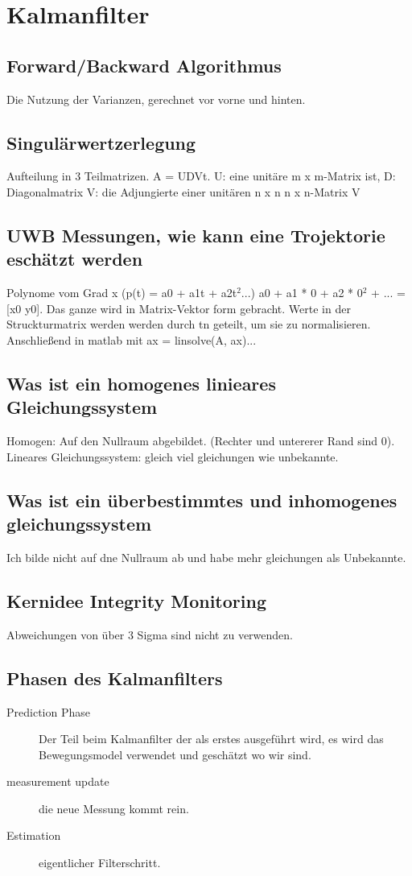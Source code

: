 
\section{Kalmanfilter}
\label{sec:faq:kalmanfilter}


\subsection{Forward/Backward Algorithmus}
Die Nutzung der Varianzen, gerechnet vor vorne und hinten.
\subsection{Singulärwertzerlegung}
 Aufteilung in 3 Teilmatrizen. A = UDVt. U: eine unitäre  m x m-Matrix ist, D: Diagonalmatrix V:  die Adjungierte einer unitären n x n  n x n-Matrix V
\subsection{UWB Messungen, wie kann eine Trojektorie eschätzt werden}
Polynome vom Grad x (p(t) = a0 + a1t + a2t$^2$...) a0 + a1 * 0 + a2 * 0$^2$ + ... = [x0 y0]. Das ganze wird in Matrix-Vektor form gebracht.  Werte in der Struckturmatrix werden werden durch tn geteilt, um sie zu normalisieren. Anschließend in matlab mit ax = linsolve(A, ax)... 
\subsection{Was ist ein homogenes linieares Gleichungssystem}
Homogen: Auf den Nullraum abgebildet. (Rechter und untererer Rand sind 0). Lineares Gleichungssystem: gleich viel gleichungen wie unbekannte.
\subsection{Was ist ein überbestimmtes und inhomogenes gleichungssystem}
Ich bilde nicht auf dne Nullraum ab und habe mehr gleichungen als Unbekannte.

\subsection{Kernidee Integrity Monitoring}

Abweichungen von über 3 Sigma sind nicht zu verwenden.

\subsection{Phasen des Kalmanfilters}
\begin{description}
\item[Prediction Phase] Der Teil beim Kalmanfilter der als erstes ausgeführt wird, es wird das Bewegungsmodel verwendet und geschätzt wo wir sind.
\item[measurement update] die neue Messung kommt rein.
\item[Estimation] eigentlicher Filterschritt.
\end{description}

